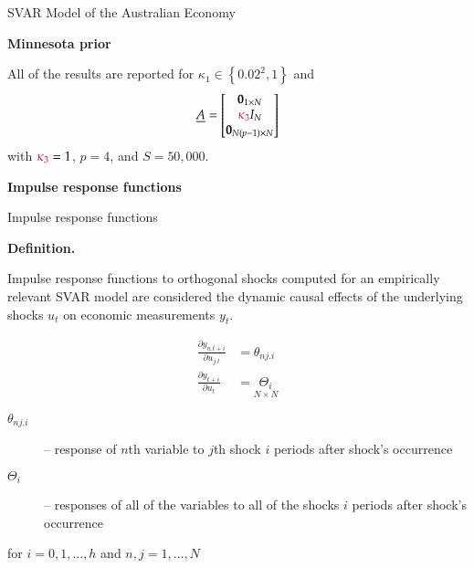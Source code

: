 \documentclass[notes,blackandwhite,mathsans,usenames,dvipsnames]{beamer}
\begin{document}
\begin{frame}{SVAR Model of the Australian Economy}

\textbf{Minnesota prior}

{\color{mcxs2}All of the results are reported for} $\kappa_1\in\left\{0.02^2,1\right\}$ {\color{mcxs2}and}
$$ \underline{A} = \begin{bmatrix} \mathbf{0}_{1\times N} \\ {\color{purple}\kappa_3}I_N \\ \mathbf{0}_{N(p-1)\times N} \end{bmatrix} $$
{\color{mcxs2}with} ${\color{purple}\kappa_3}=1$, $p=4$, {\color{mcxs2}and} $S=50,000$.


\end{frame}







{
\begin{frame}

\begin{adjustwidth}{-0.5cm}{0cm}
\vspace{8.3cm}\Large
\textbf{{\color{mcxs1}Impulse response} {\color{mcxs2}functions}}
\end{adjustwidth}

\end{frame}
}





\begin{frame}{Impulse response functions}

\bigskip\textbf{Definition.}

Impulse response functions {\color{mcxs2}to orthogonal shocks computed for an empirically relevant SVAR model are considered the dynamic causal effects of the underlying shocks} $u_t$ {\color{mcxs2}on economic measurements} $y_t$.


\begin{align*}
\frac{\partial y_{n.t+i}}{\partial u_{j.t}}&=\theta_{nj.i}\\
\frac{\partial y_{t+i}}{\partial u_t}&=\underset{N\times N}{\Theta_i}
\end{align*}

\begin{description}
\item[$\theta_{nj.i}$] {\color{mcxs2}-- response of $n$th variable to $j$th shock $i$ periods after shock's occurrence}
\item[$\Theta_i$] {\color{mcxs2}-- responses of all of the variables to all of the shocks $i$ periods after shock's occurrence}
\end{description}
{\color{mcxs2}for $i=0,1,\dots,h$ and $n,j=1,\dots,N$}

\end{frame}
\end{document}
